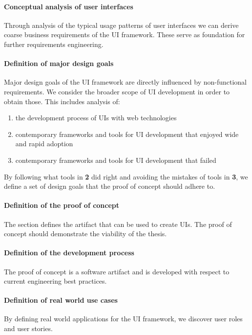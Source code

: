 \paragraph{Conceptual analysis of user interfaces}
Through analysis of the typical usage patterns of user interfaces we can derive coarse business requirements of the UI framework. These serve as foundation for further requirements engineering.

\paragraph{Definition of major design goals}
Major design goals of the UI framework are directly influenced by non-functional requirements. We consider the broader scope of UI development in order to obtain those. This includes analysis of:

\begin{enumerate}
  \item the development process of UIs with web technologies
  \item contemporary frameworks and tools for UI development that enjoyed wide and rapid adoption
  \item contemporary frameworks and tools for UI development that failed
\end{enumerate}

By following what tools in \textbf{2} did right and avoiding the mistakes of tools in \textbf{3}, we define a set of design goals that the proof of concept should adhere to.

\paragraph{Definition of the proof of concept}
The section defines the artifact that can be used to create UIs. The proof of concept should demonstrate the viability of the thesis.

\paragraph{Definition of the development process}
The proof of concept is a software artifact and is developed with respect to current engineering best practices.

\paragraph{Definition of real world use cases}
By defining real world applications for the UI framework, we discover user roles and user stories.

